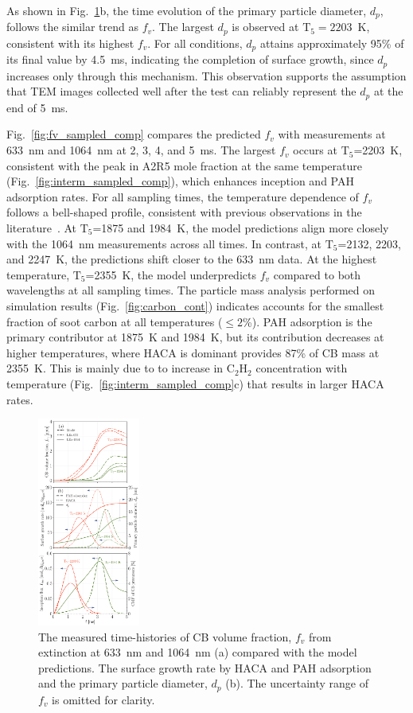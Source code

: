As shown in Fig.~\ref{fig:fv_timehis_comp}b, the time evolution of the primary particle diameter, $d_p$, follows the similar trend as $f_v$. The largest $d_p$ is observed at $\mathrm{T_5}=2203$~K, consistent with its highest $f_v$. For all conditions, $d_p$ attains approximately 95\% of its final value by 4.5~ms, indicating the completion of surface growth, since $d_p$ increases only through this mechanism. This observation supports the assumption that TEM images collected well after the test can reliably represent the $d_p$ at the end of 5~ms.

Fig.~\ref{fig:fv_sampled_comp} compares the predicted $f_v$ with measurements at 633~nm and 1064~nm at 2, 3, 4, and 5~ms. The largest $f_v$ occurs at $\mathrm{T_5}$=2203~K, consistent with the peak in A2R5 mole fraction at the same temperature (Fig.~\ref{fig:interm_sampled_comp}), which enhances inception and PAH adsorption rates. For all sampling times, the temperature dependence of $f_v$ follows a bell-shaped profile, consistent with previous observations in the literature~\citep{agafonov2016unified}. At $\mathrm{T_5}$=1875 and 1984~K, the model predictions align more closely with the 1064~nm measurements across all times. In contrast, at $\mathrm{T_5}$=2132, 2203, and 2247~K, the predictions shift closer to the 633~nm data. At the highest temperature, $\mathrm{T_5}$=2355~K, the model underpredicts $f_v$ compared to both wavelengths at all sampling times. The particle mass analysis performed on simulation results (Fig.~\ref{fig:carbon_cont}) indicates accounts for the smallest fraction of soot carbon at all temperatures ($\le2$\%). PAH adsorption is the primary contributor at 1875~K and 1984~K, but its contribution decreases at higher temperatures, where HACA is dominant provides 87\% of CB mass at 2355~K. This is mainly due to to increase in $\mathrm{C_2H_2}$ concentration with temperature (Fig.~\ref{fig:interm_sampled_comp}c) that results in larger HACA rates.

\begin{figure}[!t]
	\centering
	\includegraphics[width=0.3\textwidth]{Figures/time_fv_dp_gr_inc.pdf}
	\caption{The measured time-histories of CB volume fraction, $f_v$ from extinction at 633~nm and 1064~nm (a) compared with the model predictions. The surface growth rate by HACA and PAH adsorption and the primary particle diameter, $d_p$ (b). The uncertainty range of $f_v$ is omitted for clarity.}
	\label{fig:fv_timehis_comp} 
\end{figure}


